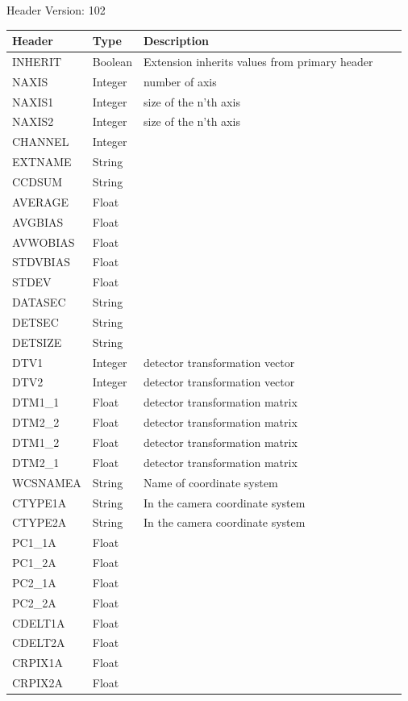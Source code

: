 Header Version: 102


\begin{longtable}{l l l l l}

\hline
Header & Type & Description \\
\hline
INHERIT & Boolean & Extension inherits values from primary header \\
NAXIS & Integer & number of axis \\
NAXIS1 & Integer & size of the n'th axis \\
NAXIS2 & Integer & size of the n'th axis \\
CHANNEL & Integer &  \\
EXTNAME & String &  \\
CCDSUM & String &  \\
AVERAGE & Float &  \\
AVGBIAS & Float &  \\
AVWOBIAS & Float &  \\
STDVBIAS & Float &  \\
STDEV & Float &  \\
DATASEC & String &  \\
DETSEC & String &  \\
DETSIZE & String &  \\
DTV1 & Integer & detector transformation vector \\
DTV2 & Integer & detector transformation vector \\
DTM1\_1 & Float & detector transformation matrix \\
DTM2\_2 & Float & detector transformation matrix \\
DTM1\_2 & Float & detector transformation matrix \\
DTM2\_1 & Float & detector transformation matrix \\
WCSNAMEA & String & Name of coordinate system \\
CTYPE1A & String & In the camera coordinate system \\
CTYPE2A & String & In the camera coordinate system \\
PC1\_1A & Float &  \\
PC1\_2A & Float &  \\
PC2\_1A & Float &  \\
PC2\_2A & Float &  \\
CDELT1A & Float &  \\
CDELT2A & Float &  \\
CRPIX1A & Float &  \\
CRPIX2A & Float &  \\

\end{longtable}

